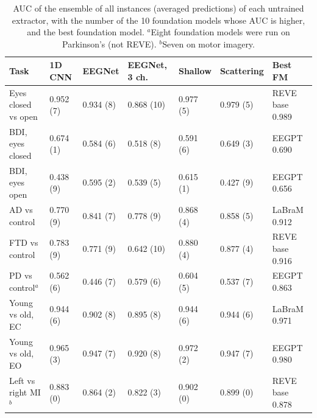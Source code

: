 \documentclass[11pt]{article}
\begin{document}
\begin{table}[h]
\centering\footnotesize\setlength{\tabcolsep}{3pt}
\caption{AUC of the ensemble of all instances (averaged predictions) of each untrained extractor,
with the number of the 10 foundation models whose AUC is higher, and the best foundation model.
$^a$Eight foundation models were run on Parkinson's (not REVE). $^b$Seven on motor imagery.}
\label{tab:fmpools}
\begin{tabular}{@{}lllllll@{}}
\toprule
Task & 1D CNN & EEGNet & EEGNet, 3 ch. & Shallow & Scattering & Best FM \\
\midrule
Eyes closed vs open & 0.952 (7) & 0.934 (8) & 0.868 (10) & 0.977 (5) & 0.979 (5) & REVE base 0.989 \\
BDI, eyes closed & 0.674 (1) & 0.584 (6) & 0.518 (8) & 0.591 (6) & 0.649 (3) & EEGPT 0.690 \\
BDI, eyes open & 0.438 (9) & 0.595 (2) & 0.539 (5) & 0.615 (1) & 0.427 (9) & EEGPT 0.656 \\
AD vs control & 0.770 (9) & 0.841 (7) & 0.778 (9) & 0.868 (4) & 0.858 (5) & LaBraM 0.912 \\
FTD vs control & 0.783 (9) & 0.771 (9) & 0.642 (10) & 0.880 (4) & 0.877 (4) & REVE base 0.916 \\
PD vs control$^a$ & 0.562 (6) & 0.446 (7) & 0.579 (6) & 0.604 (5) & 0.537 (7) & EEGPT 0.863 \\
Young vs old, EC & 0.944 (6) & 0.902 (8) & 0.895 (8) & 0.944 (6) & 0.944 (6) & LaBraM 0.971 \\
Young vs old, EO & 0.965 (3) & 0.947 (7) & 0.920 (8) & 0.972 (2) & 0.947 (7) & EEGPT 0.980 \\
Left vs right MI$^b$ & 0.883 (0) & 0.864 (2) & 0.822 (3) & 0.902 (0) & 0.899 (0) & REVE base 0.878 \\
\bottomrule
\end{tabular}
\end{table}
\end{document}
